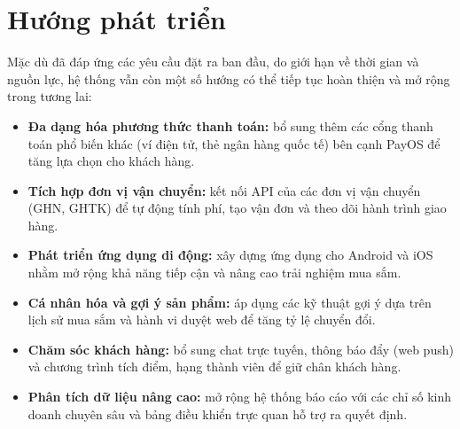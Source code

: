 \section{Hướng phát triển}

Mặc dù đã đáp ứng các yêu cầu đặt ra ban đầu, do giới hạn về thời gian và nguồn lực, hệ thống vẫn
còn một số hướng có thể tiếp tục hoàn thiện và mở rộng trong tương lai:

\begin{itemize}
  \item \textbf{Đa dạng hóa phương thức thanh toán:} bổ sung thêm các cổng thanh toán phổ biến
  khác (ví điện tử, thẻ ngân hàng quốc tế) bên cạnh PayOS để tăng lựa chọn cho khách hàng.
  \item \textbf{Tích hợp đơn vị vận chuyển:} kết nối API của các đơn vị vận chuyển (GHN, GHTK)
  để tự động tính phí, tạo vận đơn và theo dõi hành trình giao hàng.
  \item \textbf{Phát triển ứng dụng di động:} xây dựng ứng dụng cho Android và iOS nhằm mở
  rộng khả năng tiếp cận và nâng cao trải nghiệm mua sắm.
  \item \textbf{Cá nhân hóa và gợi ý sản phẩm:} áp dụng các kỹ thuật gợi ý dựa trên lịch sử mua
  sắm và hành vi duyệt web để tăng tỷ lệ chuyển đổi.
  \item \textbf{Chăm sóc khách hàng:} bổ sung chat trực tuyến, thông báo đẩy (web push) và
  chương trình tích điểm, hạng thành viên để giữ chân khách hàng.
  \item \textbf{Phân tích dữ liệu nâng cao:} mở rộng hệ thống báo cáo với các chỉ số kinh doanh
  chuyên sâu và bảng điều khiển trực quan hỗ trợ ra quyết định.
\end{itemize}
